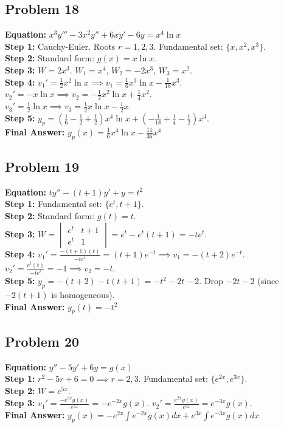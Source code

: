 \documentclass[11pt]{article}
\begin{document}
\subsection*{Problem 18}
\textbf{Equation:} $x^3 y''' - 3x^2 y'' + 6x y' - 6y = x^4 \ln x$ \\
\textbf{Step 1:} Cauchy-Euler. Roots $r = 1, 2, 3$. Fundamental set: $\{x, x^2, x^3\}$. \\
\textbf{Step 2:} Standard form: $g(x) = x \ln x$. \\
\textbf{Step 3:} $W = 2x^3$. $W_1 = x^4$, $W_2 = -2x^3$, $W_3 = x^2$. \\
\textbf{Step 4:} $v_1' = \frac{1}{2}x^2\ln x \implies v_1 = \frac{1}{6}x^3\ln x - \frac{1}{18}x^3$. \\
$v_2' = -x\ln x \implies v_2 = -\frac{1}{2}x^2\ln x + \frac{1}{4}x^2$. \\
$v_3' = \frac{1}{2}\ln x \implies v_3 = \frac{1}{2}x\ln x - \frac{1}{2}x$. \\
\textbf{Step 5:} $y_p = (\frac{1}{6} - \frac{1}{2} + \frac{1}{2})x^4\ln x + (-\frac{1}{18} + \frac{1}{4} - \frac{1}{2})x^4$. \\
\textbf{Final Answer:} $y_p(x) = \frac{1}{6}x^4\ln x - \frac{11}{36}x^4$

\subsection*{Problem 19}
\textbf{Equation:} $t y'' - (t+1)y' + y = t^2$ \\
\textbf{Step 1:} Fundamental set: $\{e^t, t+1\}$. \\
\textbf{Step 2:} Standard form: $g(t) = t$. \\
\textbf{Step 3:} $W = \begin{vmatrix} e^t & t+1 \\ e^t & 1 \end{vmatrix} = e^t - e^t(t+1) = -te^t$. \\
\textbf{Step 4:} $v_1' = \frac{-(t+1)(t)}{-te^t} = (t+1)e^{-t} \implies v_1 = -(t+2)e^{-t}$. \\
$v_2' = \frac{e^t(t)}{-te^t} = -1 \implies v_2 = -t$. \\
\textbf{Step 5:} $y_p = -(t+2) - t(t+1) = -t^2 - 2t - 2$. Drop $-2t - 2$ (since $-2(t+1)$ is homogeneous). \\
\textbf{Final Answer:} $y_p(t) = -t^2$

\subsection*{Problem 20}
\textbf{Equation:} $y'' - 5y' + 6y = g(x)$ \\
\textbf{Step 1:} $r^2 - 5r + 6 = 0 \implies r = 2, 3$. Fundamental set: $\{e^{2x}, e^{3x}\}$. \\
\textbf{Step 2:} $W = e^{5x}$. \\
\textbf{Step 3:} $v_1' = \frac{-e^{3x}g(x)}{e^{5x}} = -e^{-2x}g(x)$. $v_2' = \frac{e^{2x}g(x)}{e^{5x}} = e^{-3x}g(x)$. \\
\textbf{Final Answer:} $y_p(x) = -e^{2x}\int e^{-2x}g(x)dx + e^{3x}\int e^{-3x}g(x)dx$
\end{document}
